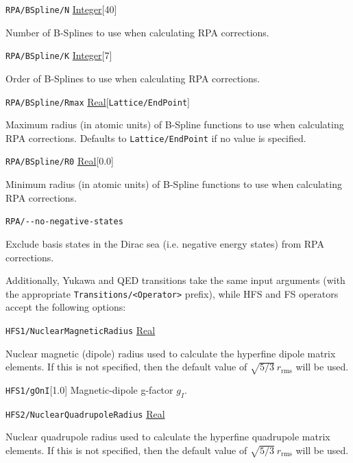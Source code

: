 \documentclass{report}
\begin{document}
\texttt{RPA/BSpline/N} \uline{Integer}[40]
\begin{adjustwidth}{1cm}{}
Number of B-Splines to use when calculating RPA corrections.
\end{adjustwidth}

\texttt{RPA/BSpline/K} \uline{Integer}[7]
\begin{adjustwidth}{1cm}{}
Order of B-Splines to use when calculating RPA corrections.
\end{adjustwidth}

\texttt{RPA/BSpline/Rmax} \uline{Real}[\texttt{Lattice/EndPoint}]
\begin{adjustwidth}{1cm}{}
Maximum radius (in atomic units) of B-Spline functions to use when calculating RPA corrections. 
Defaults to \texttt{Lattice/EndPoint} if no value is specified.
\end{adjustwidth}

\texttt{RPA/BSpline/R0} \uline{Real}[0.0]
\begin{adjustwidth}{1cm}{}
Minimum radius (in atomic units) of B-Spline functions to use when calculating RPA corrections.
\end{adjustwidth}

\texttt{RPA/{-}{-}no-negative-states}
\begin{adjustwidth}{1cm}{}
Exclude basis states in the Dirac sea (i.e. negative energy states) from RPA corrections.
\end{adjustwidth}

Additionally, Yukawa and QED transitions take the same input arguments (with the appropriate
\texttt{Transitions/\textless{Operator}\textgreater} prefix), while HFS and FS operators accept the following options:

\texttt{HFS1/NuclearMagneticRadius} \uline{Real}
\begin{adjustwidth}{1cm}{}
Nuclear magnetic (dipole) radius used to calculate the hyperfine dipole matrix elements. If this is not
specified, then the default value of $\sqrt{5/3} ~ r_{\textrm{rms}}$ will be used.
\end{adjustwidth}

\texttt{HFS1/gOnI}[1.0]
Magnetic-dipole g-factor $g_I$.

\texttt{HFS2/NuclearQuadrupoleRadius} \uline{Real}
\begin{adjustwidth}{1cm}{}
Nuclear quadrupole radius used to calculate the hyperfine quadrupole matrix elements. If this is not
specified, then the default value of $\sqrt{5/3} ~ r_{\textrm{rms}}$ will be used.
\end{adjustwidth}
\end{document}
